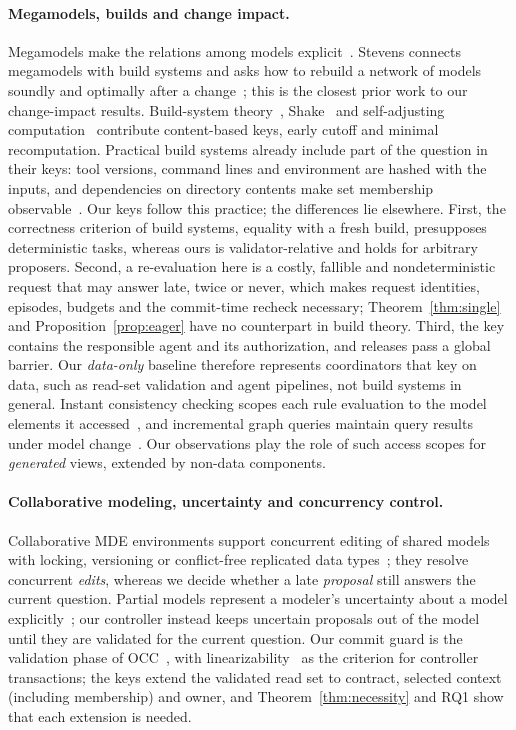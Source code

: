 \documentclass[pdflatex,sn-mathphys-num]{sn-jnl}
\theoremstyle{thmstyleone}%
\theoremstyle{thmstyletwo}%
\theoremstyle{thmstylethree}%
\begin{document}
\paragraph{Megamodels, builds and change impact.} Megamodels make the relations among models explicit~\cite{bezivin2004megamodels}. Stevens connects megamodels with build systems and asks how to rebuild a network of models soundly and optimally after a change~\cite{stevens2020megamodels}; this is the closest prior work to our change-impact results. Build-system theory~\cite{mokhov,mokhov2020jfp}, Shake~\cite{mitchell2012shake} and self-adjusting computation~\cite{acar} contribute content-based keys, early cutoff and minimal recomputation. Practical build systems already include part of the question in their keys: tool versions, command lines and environment are hashed with the inputs, and dependencies on directory contents make set membership observable~\cite{mokhov2020jfp}. Our keys follow this practice; the differences lie elsewhere. First, the correctness criterion of build systems, equality with a fresh build, presupposes deterministic tasks, whereas ours is validator-relative and holds for arbitrary proposers. Second, a re-evaluation here is a costly, fallible and nondeterministic request that may answer late, twice or never, which makes request identities, episodes, budgets and the commit-time recheck necessary; Theorem~\ref{thm:single} and Proposition~\ref{prop:eager} have no counterpart in build theory. Third, the key contains the responsible agent and its authorization, and releases pass a global barrier. Our \emph{data-only} baseline therefore represents coordinators that key on data, such as read-set validation and agent pipelines, not build systems in general. Instant consistency checking scopes each rule evaluation to the model elements it accessed~\cite{egyed2006instant,egyed2011inconsistencies}, and incremental graph queries maintain query results under model change~\cite{varro2016viatra}. Our observations play the role of such access scopes for \emph{generated} views, extended by non-data components.

\paragraph{Collaborative modeling, uncertainty and concurrency control.} Collaborative MDE environments support concurrent editing of shared models with locking, versioning or conflict-free replicated data types~\cite{franzago2018collaborative,david2023crdt}; they resolve concurrent \emph{edits}, whereas we decide whether a late \emph{proposal} still answers the current question. Partial models represent a modeler's uncertainty about a model explicitly~\cite{famelis2012partial}; our controller instead keeps uncertain proposals out of the model until they are validated for the current question. Our commit guard is the validation phase of OCC~\cite{occ}, with linearizability~\cite{herlihy1990linearizability} as the criterion for controller transactions; the keys extend the validated read set to contract, selected context (including membership) and owner, and Theorem~\ref{thm:necessity} and RQ1 show that each extension is needed.
\end{document}

